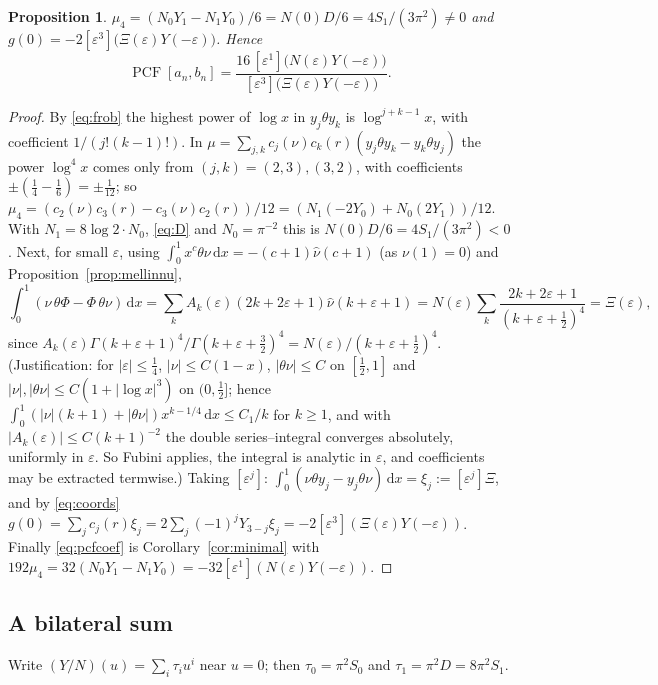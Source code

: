 \documentclass[11pt]{amsart}
\newtheorem{proposition}[theorem]{Proposition}
\theoremstyle{definition}
\theoremstyle{remark}
\numberwithin{equation}{section}
\newcommand{\PCF}{\operatorname{PCF}}
\newcommand{\dd}{\,\mathrm{d}}
\begin{document}
\begin{proposition}\label{prop:mu4}
$\mu_4=(N_0Y_1-N_1Y_0)/6=N(0)D/6=4S_1/(3\pi^2)\neq0$ and $g(0)=-2[\varepsilon^3]\bigl(\Xi(\varepsilon)Y(-\varepsilon)\bigr)$. Hence
\begin{equation}\label{eq:pcfcoef}
\PCF[a_n,b_n]=\frac{16\,[\varepsilon^1]\bigl(N(\varepsilon)Y(-\varepsilon)\bigr)}{[\varepsilon^3]\bigl(\Xi(\varepsilon)Y(-\varepsilon)\bigr)}.
\end{equation}
\end{proposition}
\begin{proof}
By \eqref{eq:frob} the highest power of $\log x$ in $y_j\theta y_k$ is $\log^{j+k-1}x$, with coefficient $1/(j!(k-1)!)$. In $\mu=\sum_{j,k}c_j(\nu)c_k(r)(y_j\theta y_k-y_k\theta y_j)$ the power $\log^4x$ comes only from $(j,k)=(2,3),(3,2)$, with coefficients $\pm(\frac14-\frac16)=\pm\frac1{12}$; so $\mu_4=(c_2(\nu)c_3(r)-c_3(\nu)c_2(r))/12=(N_1(-2Y_0)+N_0(2Y_1))/12$. With $N_1=8\log2\cdot N_0$, \eqref{eq:D} and $N_0=\pi^{-2}$ this is $N(0)D/6=4S_1/(3\pi^2)<0$.
Next, for small $\varepsilon$, using $\int_0^1x^c\theta\nu\dd x=-(c+1)\hat\nu(c+1)$ (as $\nu(1)=0$) and Proposition~\ref{prop:mellinnu},
\[
\int_0^1(\nu\,\theta\Phi-\Phi\,\theta\nu)\dd x=\sum_kA_k(\varepsilon)(2k+2\varepsilon+1)\hat\nu(k+\varepsilon+1)=N(\varepsilon)\sum_k\frac{2k+2\varepsilon+1}{(k+\varepsilon+\frac12)^4}=\Xi(\varepsilon),
\]
since $A_k(\varepsilon)\Gamma(k+\varepsilon+1)^4/\Gamma(k+\varepsilon+\frac32)^4=N(\varepsilon)/(k+\varepsilon+\frac12)^4$. (Justification: for $|\varepsilon|\le\frac14$, $|\nu|\le C(1-x)$, $|\theta\nu|\le C$ on $[\frac12,1]$ and $|\nu|,|\theta\nu|\le C(1+|\log x|^3)$ on $(0,\frac12]$; hence $\int_0^1(|\nu|(k+1)+|\theta\nu|)x^{k-1/4}\dd x\le C_1/k$ for $k\ge1$, and with $|A_k(\varepsilon)|\le C(k+1)^{-2}$ the double series--integral converges absolutely, uniformly in $\varepsilon$. So Fubini applies, the integral is analytic in $\varepsilon$, and coefficients may be extracted termwise.) Taking $[\varepsilon^j]$: $\int_0^1(\nu\theta y_j-y_j\theta\nu)\dd x=\xi_j:=[\varepsilon^j]\Xi$, and by \eqref{eq:coords} $g(0)=\sum_jc_j(r)\xi_j=2\sum_j(-1)^jY_{3-j}\xi_j=-2[\varepsilon^3](\Xi(\varepsilon)Y(-\varepsilon))$. Finally \eqref{eq:pcfcoef} is Corollary~\ref{cor:minimal} with $192\mu_4=32(N_0Y_1-N_1Y_0)=-32[\varepsilon^1](N(\varepsilon)Y(-\varepsilon))$.
\end{proof}

\subsection{A bilateral sum}
Write $(Y/N)(u)=\sum_i\tau_iu^i$ near $u=0$; then $\tau_0=\pi^2S_0$ and $\tau_1=\pi^2D=8\pi^2S_1$.
\end{document}
